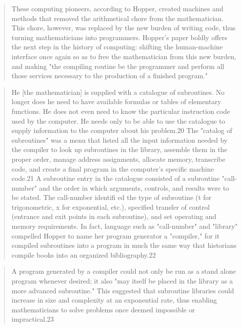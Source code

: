\begin{quotation}
These computing pioneers, according to
Hopper, created machines and methods that removed the arithmetical chore from the mathematician. This chore, however, was
replaced by the new burden of writing code, thus turning mathematicians into programmers. Hopper's paper boldly offers the
next step in the history of computing: shifting the human-machine interface once again so as to free the mathematician
from this new burden, and making "the compiling routine be
the programmer and perform all those services necessary to the
production of a finished program."
\end{quotation}

\begin{quotation}
He [the mathematician] is supplied with a catalogue of subroutines. No
longer does he need to have available formulas or tables of elementary
functions. He does not even need to know the particular instruction
code used by the computer. He needs only to be able to use the catalogue to supply information to the computer about his problem.20
The "catalog of subroutines" was a menu that listed all the
input information needed by the compiler to look up subroutines in the library, assemble them in the proper order, manage
address assignments, allocate memory, transcribe code, and create
a final program in the computer's specific machine code.21 A
subroutine entry in the catalogue consisted of a subroutine
"call-number" and the order in which arguments, controls, and
results were to be stated. The call-number identifi ed the type of
subroutine (t for trigonometric, x for exponential, etc.), specified
transfer of control (entrance and exit points in each subroutine),
and set operating and memory requirements. In fact, language
such as "call-number" and "library" compelled Hopper to name
her program generator a "compiler," for it compiled subroutines
into a program in much the same way that historians compile
books into an organized bibliography.22
\end{quotation}

\begin{quotation}
A program generated by a compiler could not only be
run as a stand alone program whenever desired; it also "may itself
be placed in the library as a more advanced subroutine." This
suggested that subroutine libraries could increase in size and
complexity at an exponential rate, thus enabling mathematicians
to solve problems once deemed impossible or impractical.23
\end{quotation}

